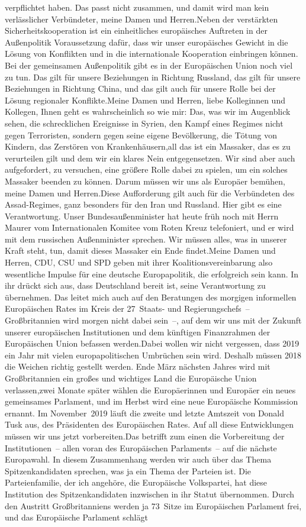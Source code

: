\documentclass{article}
\begin{document}
verpflichtet haben. Das passt nicht zusammen, und damit wird man kein verlässlicher Verbündeter, meine Damen und Herren.Neben der verstärkten Sicherheitskooperation ist ein einheitliches europäisches Auftreten in der Außenpolitik Voraussetzung dafür, dass wir unser europäisches Gewicht in die Lösung von Konflikten und in die internationale Kooperation einbringen können. Bei der gemeinsamen Außenpolitik gibt es in der Europäischen Union noch viel zu tun. Das gilt für unsere Beziehungen in Richtung Russland, das gilt für unsere Beziehungen in Richtung China, und das gilt auch für unsere Rolle bei der Lösung regionaler Konflikte.Meine Damen und Herren, liebe Kolleginnen und Kollegen, Ihnen geht es wahrscheinlich so wie mir: Das, was wir im Augenblick sehen, die schrecklichen Ereignisse in Syrien, den Kampf eines Regimes nicht gegen Terroristen, sondern gegen seine eigene Bevölkerung, die Tötung von Kindern, das Zerstören von Krankenhäusern,all das ist ein Massaker, das es zu verurteilen gilt und dem wir ein klares Nein entgegensetzen. Wir sind aber auch aufgefordert, zu versuchen, eine größere Rolle dabei zu spielen, um ein solches Massaker beenden zu können. Darum müssen wir uns als Europäer bemühen, meine Damen und Herren.Diese Aufforderung gilt auch für die Verbündeten des Assad-Regimes, ganz besonders für den Iran und Russland. Hier gibt es eine Verantwortung. Unser Bundesaußenminister hat heute früh noch mit Herrn Maurer vom Internationalen Komitee vom Roten Kreuz telefoniert, und er wird mit dem russischen Außenminister sprechen. Wir müssen alles, was in unserer Kraft steht, tun, damit dieses Massaker ein Ende findet.Meine Damen und Herren, CDU, CSU und SPD geben mit ihrer Koalitionsvereinbarung also wesentliche Impulse für eine deutsche Europapolitik, die erfolgreich sein kann. In ihr drückt sich aus, dass Deutschland bereit ist, seine Verantwortung zu übernehmen. Das leitet mich auch auf den Beratungen des morgigen informellen Europäischen Rates im Kreis der 27 Staats- und Regierungschefs – Großbritannien wird morgen nicht dabei sein –, auf dem wir uns mit der Zukunft unserer europäischen Institutionen und dem künftigen Finanzrahmen der Europäischen Union befassen werden.Dabei wollen wir nicht vergessen, dass 2019 ein Jahr mit vielen europapolitischen Umbrüchen sein wird. Deshalb müssen 2018 die Weichen richtig gestellt werden. Ende März nächsten Jahres wird mit Großbritannien ein großes und wichtiges Land die Europäische Union verlassen,zwei Monate später wählen die Europäerinnen und Europäer ein neues gemeinsames Parlament, und im Herbst wird eine neue Europäische Kommission ernannt. Im November 2019 läuft die zweite und letzte Amtszeit von Donald Tusk aus, des Präsidenten des Europäischen Rates. Auf all diese Entwicklungen müssen wir uns jetzt vorbereiten.Das betrifft zum einen die Vorbereitung der Institutionen – allen voran des Europäischen Parlaments – auf die nächste Europawahl. In diesem Zusammenhang werden wir auch über das Thema Spitzenkandidaten sprechen, was ja ein Thema der Parteien ist. Die Parteienfamilie, der ich angehöre, die Europäische Volkspartei, hat diese Institution des Spitzenkandidaten inzwischen in ihr Statut übernommen. Durch den Austritt Großbritanniens werden ja 73 Sitze im Europäischen Parlament frei, und das Europäische Parlament schlägt 
\end{document}
